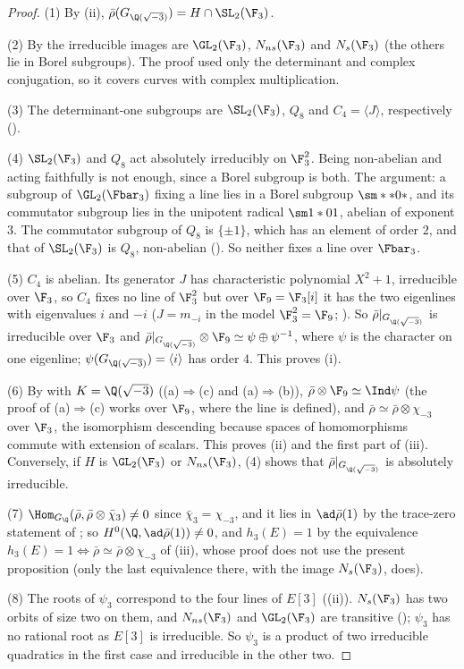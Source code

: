 \begin{proof}
(1) By (ii), $\bar\rho(G_{\Q(\sqrt{-3})})=H\cap\SL_2(\F_3)$.

(2) By  the irreducible images are $\GL_2(\F_3)$, $N_{ns}(\F_3)$ and $N_s(\F_3)$ (the others lie in Borel subgroups). The proof used
only the determinant and complex conjugation, so it covers curves with complex multiplication.

(3) The determinant-one subgroups are $\SL_2(\F_3)$, $Q_8$ and $C_4=\langle J\rangle$, respectively ().

(4) $\SL_2(\F_3)$ and $Q_8$ act absolutely irreducibly on $\F_3^2$. Being non-abelian and acting faithfully is not enough, since a Borel subgroup is
both. The argument: a subgroup of $\GL_2(\Fbar_3)$ fixing a line lies in a Borel subgroup $\sm**0*$, and its commutator subgroup lies in the
unipotent radical $\sm1*01$, abelian of exponent $3$. The commutator subgroup of $Q_8$ is $\{\pm1\}$, which has an element of order $2$, and that of
$\SL_2(\F_3)$ is $Q_8$, non-abelian (). So neither fixes a line over $\Fbar_3$.

(5) $C_4$ is abelian. Its generator $J$ has characteristic polynomial $X^2+1$, irreducible over $\F_3$, so $C_4$ fixes no line of $\F_3^2$ but over $\F_9=\F_3[i]$ it
has the two eigenlines with eigenvalues $i$ and $-i$ ($J=m_{-i}$ in the model $\F_3^2=\F_9$; ). So $\bar\rho|_{G_{\Q(\sqrt{-3})}}$ is irreducible over $\F_3$
and $\bar\rho|_{G_{\Q(\sqrt{-3})}}\otimes\F_9\simeq\psi\oplus\psi^{-1}$, where $\psi$ is the character on one eigenline; $\psi(G_{\Q(\sqrt{-3})})=\langle i\rangle$ has order $4$. This proves (i).

(6) By  with $K=\Q(\sqrt{-3})$ ((a)$\Rightarrow$(c) and (a)$\Rightarrow$(b)), $\bar\rho\otimes\F_9\simeq\Ind\psi$ (the proof of (a)$\Rightarrow$(c) works over $\F_9$,
where the line is defined), and $\bar\rho\simeq\bar\rho\otimes\chi_{-3}$ over $\F_3$, the isomorphism descending because spaces of homomorphisms commute with
extension of scalars. This proves (ii) and the first part of (iii). Conversely, if $H$ is $\GL_2(\F_3)$ or $N_{ns}(\F_3)$, (4) shows that $\bar\rho|_{G_{\Q(\sqrt{-3})}}$ is
absolutely irreducible.

(7) $\Hom_{G_\Q}(\bar\rho,\bar\rho\otimes\bar\chi_3)\ne0$ since $\bar\chi_3=\chi_{-3}$, and it lies in $\ad\bar\rho(1)$ by the trace-zero statement of ; so
$H^0(\Q,\ad\bar\rho(1))\ne0$, and $h_3(E)=1$ by the equivalence $h_3(E)=1\iff\bar\rho\simeq\bar\rho\otimes\chi_{-3}$ of (iii), whose proof does
not use the present proposition (only the last equivalence there, with the image $N_s(\F_3)$, does).

(8) The roots of $\psi_3$ correspond to the four lines of $E[3]$ ((ii)). $N_s(\F_3)$ has two orbits of size two on them, and
$N_{ns}(\F_3)$ and $\GL_2(\F_3)$ are transitive (); $\psi_3$ has no rational root as $E[3]$ is irreducible. So $\psi_3$ is a product of two
irreducible quadratics in the first case and irreducible in the other two.
\end{proof}

